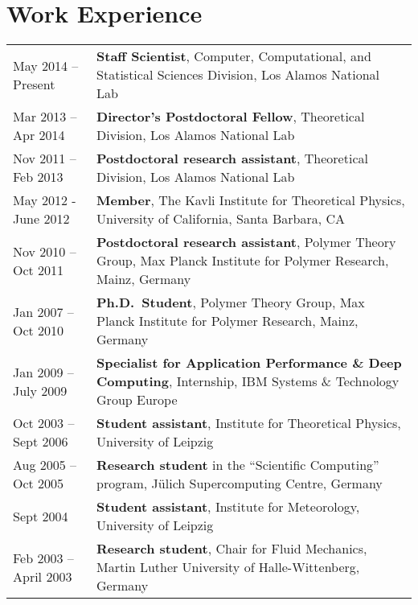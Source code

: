 \documentclass{article}
\begin{document}
\section*{Work Experience}
\begin{tabular}{p{}p{}}
May  2014 -- Present & \textbf{Staff Scientist}, Computer, Computational, and Statistical Sciences Division, Los Alamos National Lab\\
Mar 2013 -- Apr 2014 & \textbf{Director's Postdoctoral Fellow}, Theoretical Division, Los Alamos National Lab\\
Nov 2011 --Feb 2013 & \textbf{Postdoctoral research assistant}, Theoretical Division, Los Alamos National Lab\\
May 2012 - June 2012 & \textbf{Member}, The Kavli Institute for Theoretical Physics, University of California, Santa Barbara, CA \\
Nov 2010 -- Oct 2011 & \textbf{Postdoctoral research assistant}, Polymer Theory Group, Max Planck Institute for Polymer Research, Mainz, Germany\\
Jan 2007 -- Oct 2010 & \textbf{Ph.D.\ Student}, Polymer Theory Group, Max Planck Institute for Polymer Research, Mainz, Germany\\
Jan 2009 -- July 2009 & \textbf{Specialist for Application Performance \& Deep Computing}, Internship, IBM Systems \& Technology Group Europe \\
Oct 2003 -- Sept 2006 & \textbf{Student assistant}, Institute for Theoretical Physics, University of Leipzig \\
Aug 2005 -- Oct 2005 & \textbf{Research student} in the ``Scientific Computing'' program, J{\"u}lich Supercomputing Centre, Germany \\
Sept 2004 & \textbf{Student assistant}, Institute for Meteorology, University of Leipzig \\
Feb 2003 -- April 2003 & \textbf{Research student}, Chair for Fluid Mechanics, Martin Luther University of Halle-Wittenberg, Germany \\
\end{tabular}

\vspace{-2mm}
\end{document}
